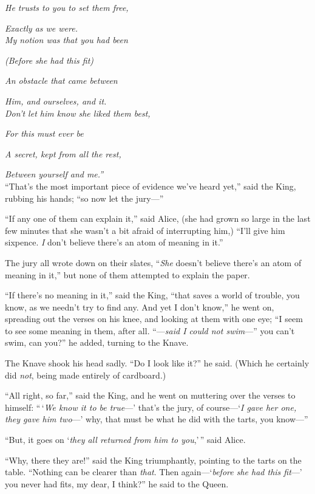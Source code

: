 \documentclass[book, 20pt]{extbook}
\begin{document}
\noindent\emph{He trusts to you to set them free,}

\emph{Exactly as we were.\\}
\bigskip
\noindent\emph{My notion was that you had been}

\emph{(Before she had this fit)\\}

\noindent\emph{An obstacle that came between}

\emph{Him, and ourselves, and it.\\}
\bigskip
\noindent\emph{Don't let him know she liked them best,}

\emph{For this must ever be\\}

\noindent\emph{A secret, kept from all the rest,}

\emph{Between yourself and me.''\\}
\bigskip
``That's the most important piece of evidence we've heard yet,'' said
the King, rubbing his hands; ``so now let the jury---''

``If any one of them can explain it,'' said Alice, (she had grown so
large in the last few minutes that she wasn't a bit afraid of
interrupting him,) ``I'll give him sixpence. \emph{I} don't believe
there's an atom of meaning in it.''

The jury all wrote down on their slates, ``\emph{She} doesn't believe
there's an atom of meaning in it,'' but none of them attempted to
explain the paper.

``If there's no meaning in it,'' said the King, ``that saves a world of
trouble, you know, as we needn't try to find any. And yet I don't
know,'' he went on, spreading out the verses on his knee, and looking at
them with one eye; ``I seem to see some meaning in them, after all.
``---\emph{said I could not swim}---'' you can't swim, can you?'' he
added, turning to the Knave.

The Knave shook his head sadly. ``Do I look like it?'' he said. (Which
he certainly did \emph{not}, being made entirely of cardboard.)

``All right, so far,'' said the King, and he went on muttering over the
verses to himself: ``\,`\emph{We know it to be true}---' that's the
jury, of course---`\emph{I gave her one, they gave him two}---' why,
that must be what he did with the tarts, you know---''

``But, it goes on `\emph{they all returned from him to you},'\,'' said
Alice.

``Why, there they are!'' said the King triumphantly, pointing to the
tarts on the table. ``Nothing can be clearer than \emph{that}. Then
again---`\emph{before she had this fit}---' you never had fits, my dear,
I think?'' he said to the Queen.
\end{document}
